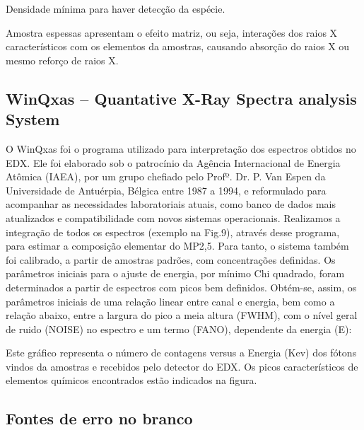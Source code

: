 Densidade mínima para haver detecção da espécie. %

Amostra espessas apresentam o efeito matriz, ou seja, interações dos 
raios X característicos com os elementos da amostras, causando 
absorção do raios X ou mesmo reforço de raios X.


\subsection{WinQxas – Quantative X-Ray Spectra analysis System}

O WinQxas foi o programa utilizado para interpretação dos espectros obtidos no EDX. Ele foi elaborado sob o patrocínio da Agência Internacional de Energia Atômica (IAEA), por um grupo chefiado pelo Profº. Dr. P. Van Espen da Universidade de Antuérpia, Bélgica entre 1987 a 1994, e reformulado para acompanhar as necessidades laboratoriais atuais, como banco de dados mais atualizados e compatibilidade com novos sistemas operacionais. 
Realizamos a integração de todos os espectros (exemplo na Fig.9), através desse programa, para estimar a composição elementar do MP2,5. Para tanto, o sistema também foi  calibrado, a partir de amostras padrões, com concentrações definidas. Os parâmetros iniciais para o ajuste de energia, por mínimo Chi quadrado, foram determinados  a partir de espectros com picos bem definidos. Obtém-se, assim, os parâmetros iniciais de uma relação linear entre canal e energia, bem como a relação abaixo, entre a largura do pico a meia altura (FWHM), com o nível geral de ruido (NOISE)  no espectro e um termo (FANO), dependente da energia (E):



Este gráfico representa o número de contagens  versus a Energia (Kev) dos 	fótons vindos da amostras e recebidos pelo detector do EDX. Os picos 	característicos de elementos químicos encontrados estão indicados na figura.

\subsection{Fontes de erro no branco}

